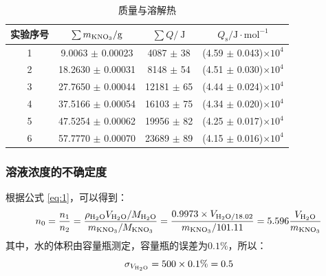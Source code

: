 \documentclass[cn,hazy,pku,12pt,normal,math=newtx,cite=super]{elegantnote}
\begin{document}
\begin{table}[htbp]
    \centering
    \caption{质量与溶解热}
    \begin{tabular}{cccc}
        \toprule
        实验序号 & $\sum m_{\ce{KNO_3}}/\mathrm{g}$ & $\sum Q/\mathrm{~J}$ & $Q_{\mathrm{s}}/\mathrm{J\cdot mol^{-1}}$ \\
        \midrule
        1 & 9.0063 $\pm$ 0.00023 & 4087 $\pm$ 38 & (4.59 $\pm$ 0.043)$\times 10^4$\\
        2 & 18.2630 $\pm$ 0.00031 & 8148 $\pm$ 54 & (4.51 $\pm$ 0.030)$\times 10^4$\\
        3 & 27.7650 $\pm$ 0.00044 & 12181 $\pm$ 65 & (4.44 $\pm$ 0.024)$\times 10^4$\\
        4 & 37.5166 $\pm$ 0.00054 & 16103 $\pm$ 75 & (4.34 $\pm$ 0.020)$\times 10^4$\\
        5 & 47.5254 $\pm$ 0.00062 & 19956 $\pm$ 82 & (4.25 $\pm$ 0.017)$\times 10^4$\\
        6 & 57.7770 $\pm$ 0.00070 & 23689 $\pm$ 89 & (4.15 $\pm$ 0.016)$\times 10^4$\\
        \bottomrule
    \end{tabular}
    \label{tab:14}
\end{table}

\subsubsection{溶液浓度的不确定度}

根据公式 \eqref{eq:1}，可以得到：
\begin{equation}
    n_0=\frac{n_1}{n_2}=\frac{\rho_{\ce{H_2O}}V_{\ce{H_2O}}/M_{\ce{H_2O}}}{m_{\ce{KNO_3}}/M_{\ce{KNO_3}}}=\frac{0.9973\times V_{\ce{H_2O}/18.02}}{m_{\ce{KNO_3}}/101.11} = 5.596\frac{V_{\ce{H_2O}}}{m_{\ce{KNO_3}}}
\end{equation}
其中，水的体积由容量瓶测定，容量瓶的误差为$0.1\%$，所以：
\begin{equation*}
    \sigma_{V_{\ce{H_2O}}} = 500 \times 0.1\% = 0.5
\end{equation*}
\end{document}
